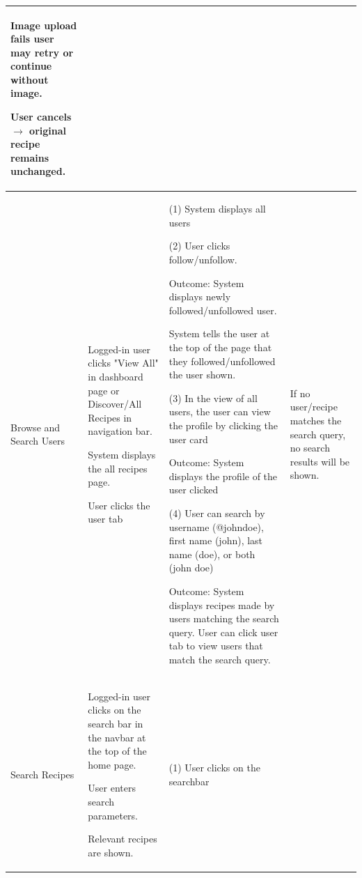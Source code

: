 \documentclass[10pt,a4paper]{article}
\begin{document}
\begin{longtable}{|p{30mm}|p{30mm}|p{40mm}|p{40mm}|}
Image upload fails user may retry or continue without image.

\vspace{1 mm}

User cancels $\rightarrow$  original recipe remains unchanged. \\






\hline
Browse and Search Users
&
Logged-in user clicks "View All" in dashboard page
or Discover/All Recipes in navigation bar.

System displays the all recipes page.

User clicks the user tab
&
(1) System displays all users

\vspace{1 mm}

(2) User clicks follow/unfollow.

Outcome: System displays newly followed/unfollowed user.

System tells the user at the top of the page that they followed/unfollowed the user shown.

\vspace{1 mm}

(3) In the view of all users, the user can view the profile by clicking the user card

Outcome: System displays the profile of the user clicked

\vspace{1 mm}

(4) User can search by username (@johndoe), first name (john), last name (doe), or both (john doe)

Outcome: System displays recipes made by users matching the search query.
User can click user tab to view users that match the search query.

&
\vspace{1 mm}
If no user/recipe matches the search query, no search results will be shown. \\





\hline
Search Recipes
&
Logged-in user clicks on the search bar in the navbar at the top of the home page.

User enters search parameters.

Relevant recipes are shown.
&
(1) User clicks on the searchbar

\vspace{1 mm}


\end{longtable}
\end{document}
